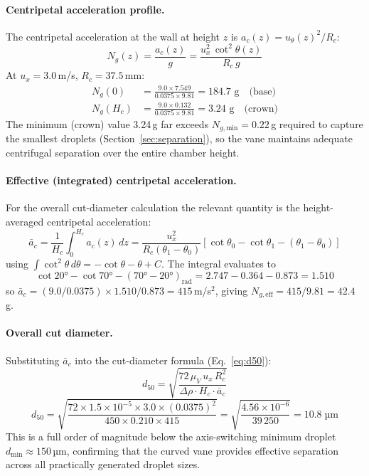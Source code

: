\documentclass[11pt,letterpaper]{article}
\begin{document}
\paragraph{Centripetal acceleration profile.}
The centripetal acceleration at the wall at height $z$ is
$a_c(z) = u_\theta(z)^2/R_c$:
\begin{equation}
  N_g(z) = \frac{a_c(z)}{g} = \frac{u_x^2\,\cot^2\!\theta(z)}{R_c\,g}
  \label{eq:Ng_z}
\end{equation}
At $u_x = 3.0$\,m/s, $R_c = 37.5$\,mm:
\begin{align*}
  N_g(0)  &= \frac{9.0 \times 7.549}{0.0375 \times 9.81} = \mathbf{184.7}\text{ g}
             \quad\text{(base)} \\
  N_g(H_c) &= \frac{9.0 \times 0.132}{0.0375 \times 9.81} = \mathbf{3.24}\text{ g}
             \quad\text{(crown)}
\end{align*}
The minimum (crown) value 3.24\,g far exceeds $N_{g,\mathrm{min}} = 0.22$\,g
required to capture the smallest droplets (Section~\ref{sec:separation}),
so the vane maintains adequate centrifugal separation over the entire
chamber height.

\paragraph{Effective (integrated) centripetal acceleration.}
For the overall cut-diameter calculation the relevant quantity is the
height-averaged centripetal acceleration:
\begin{equation}
  \bar{a}_c = \frac{1}{H_c}\int_0^{H_c} a_c(z)\,dz
  = \frac{u_x^2}{R_c(\theta_1-\theta_0)}
    \!\left[\cot\theta_0 - \cot\theta_1 - (\theta_1-\theta_0)\right]
  \label{eq:ac_eff}
\end{equation}
using $\int\cot^2\theta\,d\theta = -\cot\theta - \theta + C$.  The integral
evaluates to
\[
  \cot 20° - \cot 70° - (70°-20°)_{\mathrm{rad}}
  = 2.747 - 0.364 - 0.873 = 1.510
\]
so $\bar{a}_c = (9.0/0.0375) \times 1.510/0.873 = 415$\,m/s$^2$,
giving $N_{g,\mathrm{eff}} = 415/9.81 = \mathbf{42.4}$\,g.

\paragraph{Overall cut diameter.}
Substituting $\bar{a}_c$ into the cut-diameter formula (Eq.~\ref{eq:d50}):
\begin{equation}
  d_{50} = \sqrt{\frac{72\,\mu_V\,u_x\,R_c^2}{\Delta\rho\cdot H_c\cdot\bar{a}_c}}
  \label{eq:d50_vane}
\end{equation}
\[
  d_{50} = \sqrt{\frac{72\times1.5\times10^{-5}\times3.0\times(0.0375)^2}
                      {450\times0.210\times415}}
         = \sqrt{\frac{4.56\times10^{-6}}{39\,250}}
         = \mathbf{10.8}\;\text{µm}
\]
This is a full order of magnitude below the axis-switching minimum droplet
$d_{\min} \approx 150$\,µm, confirming that the curved vane provides
effective separation across all practically generated droplet sizes.
\end{document}
